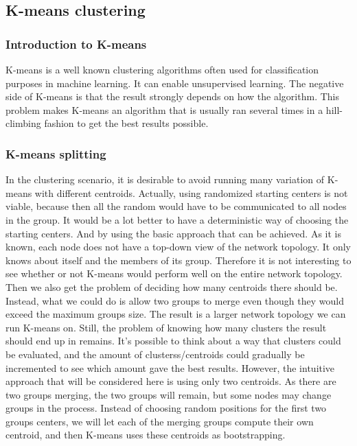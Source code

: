 
\subsection{K-means clustering}
\subsubsection{Introduction to K-means}
K-means is a well known clustering algorithms often used for classification purposes in machine learning. It can enable unsupervised learning. The 
negative side of K-means is that the result strongly depends on how the algorithm. This problem makes K-means an algorithm that is usually ran several
times in a hill-climbing fashion to get the best results possible. 
\subsubsection{K-means splitting}
In the clustering scenario, it is desirable to avoid running many variation of K-means with different centroids. Actually, using randomized starting centers
is not viable, because then all the random would have to be communicated to all nodes in the group. It would be a lot better to have a deterministic way 
of choosing the starting centers. And by using the basic approach that can be achieved. As it is known, each node does not have a top-down view of the network 
topology. It only knows about itself and the members of its group. Therefore it is not interesting to see whether or not K-means would perform well on the entire 
network topology. Then we also get the problem of deciding how many centroids there should be. Instead, what we could do is allow two groups to merge even though
they would exceed the maximum groups size. The result is a larger network topology we can run K-means on. Still, the problem of knowing how many clusters
the result should end up in remains. It's possible to think about a way that clusters could be evaluated, and the amount of clusterss/centroids could gradually be
incremented to see which amount gave the best results. However, the intuitive approach that will be considered here is using only two centroids. As there are two groups merging, the two
groups will remain, but some nodes may change groups in the process. Instead of choosing random positions for the first two groups centers, we will let each of the merging groups
compute their own centroid, and then K-means uses these centroids as bootstrapping. 

